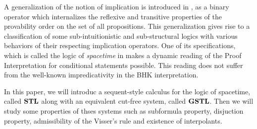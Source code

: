 A generalization of the notion of implication is introduced in \cite{amir}, as a binary operator which internalizes the reflexive and transitive properties of the provability order on the set of all propositions. This generalization gives rise to a classification of some sub-intuitionistic and sub-structural logics with various behaviors of their respecting implication operators. One of its specifications, which is called the logic of \emph{spacetime} in \cite{amir} makes a dynamic reading of the Proof Interpretation for conditional statements possible. This reading does not suffer from the well-known impredicativity in the BHK interpretation.

In this paper, we will introduc a sequent-style calculus for the logic of spacetime, called $\mathbf{STL}$ along with an equivalent cut-free system, called $\mathbf{GSTL}$. Then we will study some properties of thses systems such as subformula property, disjuction property, admissibility of the Visser's rule and existence of interpolants.